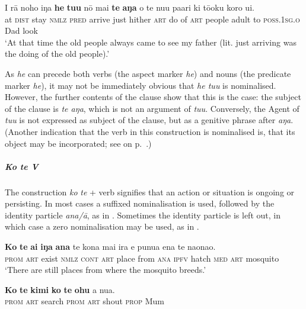 \ea\label{ex:3.23}
\gll {\ꞌ}I rā noho iŋa \textbf{he} \textbf{tu{\ꞌ}u} nō mai \textbf{te} \textbf{aŋa} o te nu{\ꞌ}u pa{\ꞌ}ari ki tō{\ꞌ}oku koro u{\ꞌ}i.\\
at \textsc{dist} stay \textsc{nmlz} \textsc{pred} arrive just hither \textsc{art} do of \textsc{art} people adult to \textsc{poss.1sg.o} Dad look\\

\glt
‘At that time the old people always came to see my father (lit. just arriving was the doing of the old people).’ \textstyleExampleref{[R649.101]} 
\z

As \textit{he} can precede both verbs (the aspect marker \textit{he}) and nouns (the predicate marker \textit{he}), it may not be immediately obvious that \textit{he tu{\ꞌ}u} is nominalised. However, the further contents of the clause show that this is the case: the subject of the clause is \textit{te aŋa}, which is not an argument of \textit{tu{\ꞌ}u}. Conversely, the Agent of \textit{tu{\ꞌ}u} is not expressed as subject of the clause, but as a genitive phrase after \textit{aŋa}. (Another indication that the verb in this construction is nominalised is, that its object may be incorporated; see  on p.~\pageref{ex:5.128}.)

\subparagraph{\textit{Ko te V}} The construction \textit{ko} \textit{te} + verb signifies that an action or situation is ongoing or persisting. In most cases a suffixed nominalisation is used, followed by the identity particle \textit{{\ꞌ}ana}\textit{/{\ꞌ}ā}, as in . Sometimes the identity particle is left out, in which case a zero nominalisation may be used, as in . 

\ea\label{ex:3.24}
\gll \textbf{Ko} \textbf{te} \textbf{ai} \textbf{iŋa} \textbf{{\ꞌ}ana} te kona mai ira e punua ena te naonao. \\
\textsc{prom} \textsc{art} exist \textsc{nmlz} \textsc{cont} \textsc{art} place from \textsc{ana} \textsc{ipfv} hatch \textsc{med} \textsc{art} mosquito \\

\glt 
‘There are still places from where the mosquito breeds.’ \textstyleExampleref{[R535.054]} 
\z

\ea\label{ex:3.25}
\gll \textbf{Ko} \textbf{te} \textbf{kimi} \textbf{ko} \textbf{te} \textbf{ohu} a nua. \\
\textsc{prom} \textsc{art} search \textsc{prom} \textsc{art} shout \textsc{prop} Mum \\

